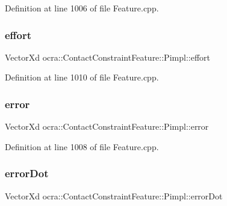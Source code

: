 Definition at line 1006 of file Feature.\+cpp.

\hypertarget{structocra_1_1ContactConstraintFeature_1_1Pimpl_af9482cf46b3e6e4e44c3244b63d899c5}{}\label{structocra_1_1ContactConstraintFeature_1_1Pimpl_af9482cf46b3e6e4e44c3244b63d899c5} 
\subsubsection{\texorpdfstring{effort}{effort}}
{\footnotesize\ttfamily Vector\+Xd ocra\+::\+Contact\+Constraint\+Feature\+::\+Pimpl\+::effort}



Definition at line 1010 of file Feature.\+cpp.

\hypertarget{structocra_1_1ContactConstraintFeature_1_1Pimpl_a00ed1a9962ef8b48ed816d4f3f39394b}{}\label{structocra_1_1ContactConstraintFeature_1_1Pimpl_a00ed1a9962ef8b48ed816d4f3f39394b} 
\subsubsection{\texorpdfstring{error}{error}}
{\footnotesize\ttfamily Vector\+Xd ocra\+::\+Contact\+Constraint\+Feature\+::\+Pimpl\+::error}



Definition at line 1008 of file Feature.\+cpp.

\hypertarget{structocra_1_1ContactConstraintFeature_1_1Pimpl_a43821a1f06ddd5af36588e84def45897}{}\label{structocra_1_1ContactConstraintFeature_1_1Pimpl_a43821a1f06ddd5af36588e84def45897} 
\subsubsection{\texorpdfstring{error\+Dot}{errorDot}}
{\footnotesize\ttfamily Vector\+Xd ocra\+::\+Contact\+Constraint\+Feature\+::\+Pimpl\+::error\+Dot}



